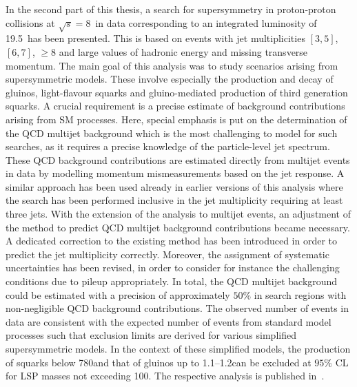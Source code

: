 In the second part of this thesis, a search for supersymmetry in proton-proton collisions at $\sqrt{s}=8$~\tev in data corresponding to an integrated luminosity of 19.5~\fbinv has been presented. This is based on events with jet multiplicities $[3, 5]$, $[6, 7]$, $\ge 8$ and large values of hadronic energy and missing transverse momentum. The main goal of this analysis was to study scenarios arising from supersymmetric models. These involve especially the production and decay of gluinos, light-flavour squarks and gluino-mediated production of third generation squarks. A crucial requirement is a precise estimate of background contributions arising from SM processes. Here, special emphasis is put on the determination of the QCD multijet background which is the most challenging to model for such searches, as it requires a precise knowledge of the particle-level jet spectrum. These QCD background contributions are estimated directly from multijet events in data by modelling momentum mismeasurements based on the jet response. A similar approach has been used already in earlier versions of this analysis where the search has been performed inclusive in the jet multiplicity requiring at least three jets. With the extension of the analysis to multijet events, an adjustment of the method to predict QCD multijet background contributions became necessary. A dedicated correction to the existing method has been introduced in order to predict the jet multiplicity correctly. Moreover, the assignment of systematic uncertainties has been revised, in order to consider for instance the challenging conditions due to pileup appropriately. In total, the QCD multijet background could be estimated with a precision of approximately $50\%$ in search regions with non-negligible QCD background contributions. The observed number of events in data are consistent with the expected number of events from standard model processes such that exclusion limits are derived for various simplified supersymmetric models. In the context of these simplified models, the production of squarks below 780\gev and that of gluinos up to 1.1--1.2\tev can be excluded at $95\%$ CL for LSP masses not exceeding 100\gev. The respective analysis is published in~\cite{Chatrchyan:2014lfa}. \\

